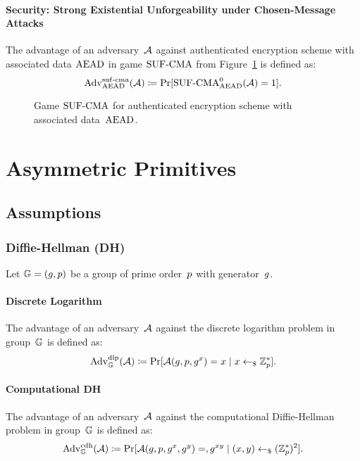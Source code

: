 \documentclass[a4paper,orivec]{llncs}
\begin{document}
\paragraph{Security: Strong Existential Unforgeability under Chosen-Message Attacks}
The advantage of an adversary~$\mathcal{A}$ against authenticated encryption scheme with associated data $\mathrm{AEAD}$ in game ${\mathrm{SUF}\text{-}\mathrm{CMA}}$ from Figure~\ref{fig:sym:aenc:suf} is defined as:
\[
\mathrm{Adv}_{\mathrm{AEAD}}^{\mathrm{suf}\text{-}\mathrm{cma}}(\mathcal{A})\coloneqq\Pr[{\mathrm{SUF}\text{-}\mathrm{CMA}}_{\mathrm{AEAD}}^0(\mathcal{A})=1]\text{.}
\]

\begin{figure}[!ht]
    \centering
    \nicoresetlinenr%
    \fbox{%
        \scalebox{\codescalefactor}{%
        }%
    }
    \caption{%
        Game ${\mathrm{SUF}\text{-}\mathrm{CMA}}$ for authenticated encryption scheme with associated data~$\mathrm{AEAD}$.
    }
    \label{fig:sym:aenc:suf}
\end{figure}




\section{Asymmetric Primitives}
\label{sec:asym}

\subsection{Assumptions}
\label{sec:asym:assumptions}

\subsubsection{Diffie-Hellman (DH)}
\label{sec:asym:assumptions:dh}
Let $\mathbb{G}=(g,p)$ be a group of prime order~$p$ with generator~$g$.

\paragraph{Discrete Logarithm}
The advantage of an adversary~$\mathcal{A}$ against the discrete logarithm problem in group~$\mathbb{G}$ is defined as:
\[
\mathrm{Adv}_{\mathbb{G}}^{\mathrm{dlp}}(\mathcal{A})\coloneqq\Pr[\mathcal{A}(g,p,g^x)=x\mid x\gets_\$\mathbb{Z}_p^*]\text{.}
\]


\paragraph{Computational DH}
The advantage of an adversary~$\mathcal{A}$ against the computational Diffie-Hellman problem in group~$\mathbb{G}$ is defined as:
\[
\mathrm{Adv}_{\mathbb{G}}^{\mathrm{cdh}}(\mathcal{A})\coloneqq\Pr[\mathcal{A}(g,p,g^x,g^y)=,g^{xy}\mid (x,y)\gets_\$(\mathbb{Z}_p^*)^2]\text{.}
\]
\end{document}
